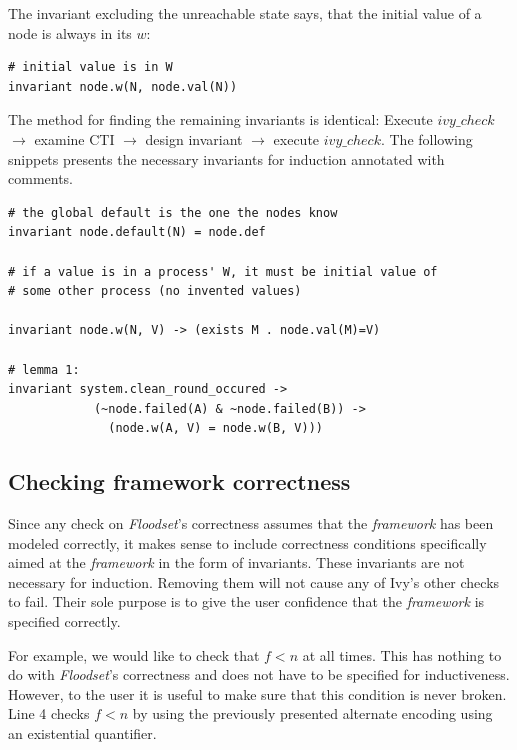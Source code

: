 \documentclass[fleqn]{article}
\begin{document}
The invariant excluding the unreachable state says, that the initial value of a node is always in its $w$:
\begin{mdframed}[nobreak=true, backgroundcolor=light-gray, roundcorner=10pt,leftmargin=1, rightmargin=1, innerleftmargin=15, innertopmargin=15,innerbottommargin=15, outerlinewidth=1, linecolor=light-gray]
\begin{lstlisting}
# initial value is in W
invariant node.w(N, node.val(N))
\end{lstlisting}
\end{mdframed}

The method for finding the remaining invariants is identical: Execute $ivy\_check$ $\rightarrow$ examine CTI $\rightarrow$ design invariant $\rightarrow$ execute $ivy\_check$. The following snippets presents the necessary invariants for induction annotated with comments.
\begin{mdframed}[nobreak=true, backgroundcolor=light-gray, roundcorner=10pt,leftmargin=1, rightmargin=1, innerleftmargin=15, innertopmargin=15,innerbottommargin=15, outerlinewidth=1, linecolor=light-gray]
\begin{lstlisting}
# the global default is the one the nodes know
invariant node.default(N) = node.def

# if a value is in a process' W, it must be initial value of
# some other process (no invented values)

invariant node.w(N, V) -> (exists M . node.val(M)=V)

# lemma 1:
invariant system.clean_round_occured ->
            (~node.failed(A) & ~node.failed(B)) ->
              (node.w(A, V) = node.w(B, V)))
\end{lstlisting}
\end{mdframed}

\subsection{Checking framework correctness}

Since any check on \textit{Floodset}'s correctness assumes that the \textit{framework} has been modeled correctly, it makes sense to include correctness conditions specifically aimed at the \textit{framework} in the form of invariants. These invariants are not necessary for induction. Removing them will not cause any of Ivy's other checks to fail. Their sole purpose is to give the user confidence that the \textit{framework} is specified correctly.

For example, we would like to check that $f < n$ at all times. This has nothing to do with \textit{Floodset}'s correctness and does not have to be specified for inductiveness. However, to the user it is useful to make sure that this condition is never broken. Line 4 checks $f < n$ by using the previously presented alternate encoding using an existential quantifier.
\end{document}
